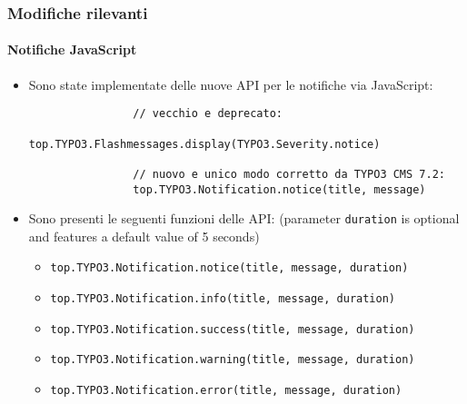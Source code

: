 \begin{frame}[fragile]
	\frametitle{Modifiche rilevanti}
	\framesubtitle{Notifiche JavaScript}

	\begin{itemize}

		\item Sono state implementate delle nuove API per le notifiche via JavaScript:
			\begin{lstlisting}
				// vecchio e deprecato:
				top.TYPO3.Flashmessages.display(TYPO3.Severity.notice)

				// nuovo e unico modo corretto da TYPO3 CMS 7.2:
				top.TYPO3.Notification.notice(title, message)
    		\end{lstlisting}

		\item Sono presenti le seguenti funzioni delle API:\newline
			\small(parameter \texttt{duration} is optional and features a default value of 5 seconds)\normalsize
			\begin{itemize}
				\item \normalsize\smaller\texttt{top.TYPO3.Notification.notice(title, message, duration)}\normalsize
				\item \smaller\texttt{top.TYPO3.Notification.info(title, message, duration)}\normalsize
				\item \smaller\texttt{top.TYPO3.Notification.success(title, message, duration)}\normalsize
				\item \smaller\texttt{top.TYPO3.Notification.warning(title, message, duration)}\normalsize
				\item \smaller\texttt{top.TYPO3.Notification.error(title, message, duration)}\normalsize
			\end{itemize}

	\end{itemize}

\end{frame}

